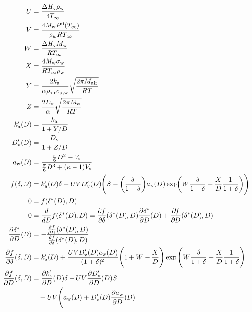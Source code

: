 \documentclass{article}
\begin{document}
\begin{align}
  U &= \frac{\Delta H_{\rm v} \rho_{\rm w}}{4 T_{\infty}} \\
  V &= \frac{4 M_{\rm w} P^{\rm 0}(T_{\infty})}{\rho_w R T_{\infty}} \\
  W &= \frac{\Delta H_{\rm v} M_{\rm w}}{R T_{\infty}} \\
  X &= \frac{4 M_{\rm w}\sigma_{\rm w}}{R T_{\infty} \rho_{\rm w}} \\
  Y &= \frac{2 k_{\rm a}}{\alpha \rho_{\rm air} c_{\rm p,w}} \sqrt{\frac{2 \pi M_{\rm air}}{R T}} \\
  Z &= \frac{2 D_{\rm v}}{\alpha} \sqrt{\frac{2 \pi M_{\rm w}}{R T}} \\
  k_{\rm a}'(D) &= \frac{k_{\rm a}}{1 + Y / D} \\
  D_{\rm v}'(D) &= \frac{D_{\rm v}}{1 + Z / D} \\
  a_{\rm w}(D) &= \frac{\frac{\pi}{6}D^3 - V_{\rm s}}{\frac{\pi}{6}D^3 + (\kappa - 1) V_{\rm s}} \\
  f(\delta, D) &= k_{\rm a}'(D) \delta
  - U V D_{\rm v}'(D) \Biggl(S - \biggl(\frac{\delta}{1+\delta}\biggr)
  a_{\rm w}(D)
  \exp\biggl(W \frac{\delta}{1+\delta} + \frac{X}{D} \frac{1}{1+\delta}\biggr) \Biggr) \\
  0 &= f(\delta^*(D), D) \\
  0 &= \frac{d}{d D} f(\delta^*(D), D)
  = \frac{\partial f}{\partial \delta}(\delta^*(D), D)
  \frac{\partial \delta^*}{\partial D}(D)
  + \frac{\partial f}{\partial D}(\delta^*(D), D) \\
  \frac{\partial \delta^*}{\partial D}(D)
  &= - \frac{\frac{\partial f}{\partial D}(\delta^*(D), D)}{\frac{\partial f}{\partial \delta}(\delta^*(D), D)} \\
  \frac{\partial f}{\partial \delta}(\delta, D) &= k_{\rm a}'(D) +
  \frac{U V D_{\rm v}'(D) a_{\rm w}(D)}{(1 + \delta)^2} \Biggl( 1 + W
  - \frac{X}{D} \Biggr) \exp{\Biggl(W \frac{\delta}{1+\delta} +
      \frac{X}{D} \frac{1}{1+\delta}\Biggr)} \\
  \frac{\partial f}{\partial D}(\delta, D) &=
  \frac{\partial k_{\rm a}'}{\partial D}(D) \delta
  - U V \frac{\partial D_{\rm v}'}{\partial D}(D) S \nonumber \\
  &\quad + U V \Biggl( a_{\rm w}(D) + D_{\rm v}'(D) \frac{\partial a_{\rm w}}{\partial D}(D)

\end{align}
\end{document}
